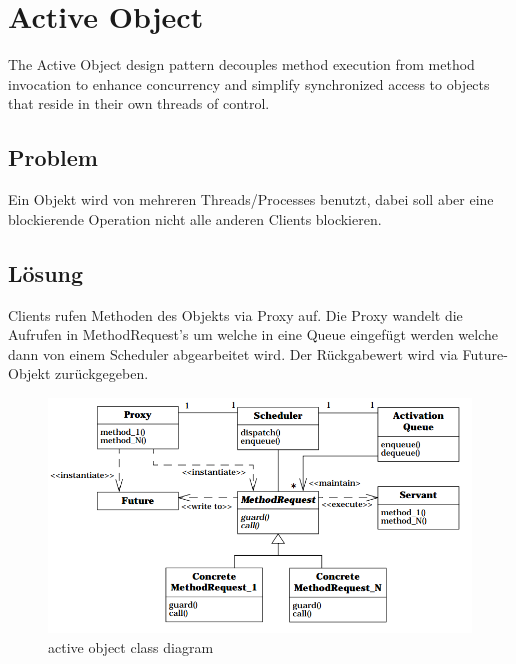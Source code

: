\section{Active Object}

The Active Object design pattern decouples method execution from method invocation to enhance concurrency and simplify synchronized access to objects that reside in their own threads of control.


\subsection*{Problem}


Ein Objekt wird von mehreren Threads/Processes benutzt, dabei soll aber eine blockierende Operation nicht alle anderen Clients blockieren.

\subsection*{Lösung}


Clients rufen Methoden des Objekts via Proxy auf. Die Proxy wandelt die Aufrufen in MethodRequest's um welche in eine Queue eingefügt werden welche dann von einem Scheduler abgearbeitet wird.
Der Rückgabewert wird via Future-Objekt zurückgegeben.

\begin{figure}[H]
	\centering
	\includegraphics[width=\textwidth]{content/posa2/active-object/images/act-obj_class-diagram.png}
	\caption{active object class diagram}
\end{figure}


